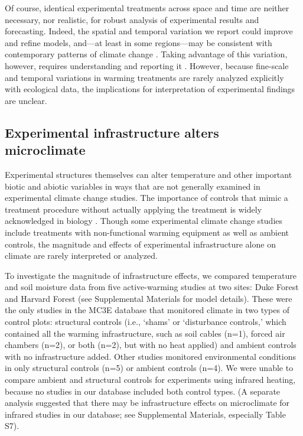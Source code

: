 \documentclass{article}
\begin{document}
\par Of course, identical experimental treatments across space and time are neither necessary, nor realistic, for robust analysis of experimental results and forecasting. %
Indeed, the spatial and temporal variation we report could improve and refine models, and---at least in some regions---may be consistent with contemporary patterns of climate change \citep{ipcc2013}. Taking advantage of this variation, however, requires understanding and reporting it \citep[e.g.,][]{milcu2016}. However, because fine-scale and temporal variations in warming treatments are rarely analyzed explicitly with ecological data, the implications for interpretation of experimental findings are unclear.


\subsection* {Experimental infrastructure alters microclimate}
Experimental structures themselves can alter temperature and other important biotic and abiotic variables in ways that are not generally examined in experimental climate change studies. The importance of controls that mimic a treatment procedure without actually applying the treatment is widely acknowledged in biology \citep[e.g.,][]{dayton1971,spector2001,johnson2002,quinn2002}. Though some experimental climate change studies include treatments with non-functional warming equipment as well as ambient controls, the magnitude and effects of experimental infrastructure alone on climate are rarely interpreted or analyzed.
\par To investigate the magnitude of infrastructure effects, we compared temperature and soil moisture data from five active-warming studies at two sites: Duke Forest and Harvard Forest \citep{farnsworth1995,clark2014b, marchin2015, pelini2011}(see Supplemental Materials for model details). These were the only studies in the MC3E database that monitored climate in two types of control plots: structural controls (i.e., `shams' or `disturbance controls,' which contained all the warming infrastructure, such as soil cables (n=1), forced air chambers (n=2), or both (n=2), but with no heat applied) and ambient controls with no infrastructure added. Other studies monitored environmental conditions in only structural controls (n=5) or ambient controls (n=4). We were unable to compare ambient and structural controls for experiments using infrared heating, because no studies in our database included both control types. (A separate analysis suggested that there may be infrastructure effects on microclimate for infrared studies in our database; see Supplemental Materials, especially Table S7). 
\end{document}
